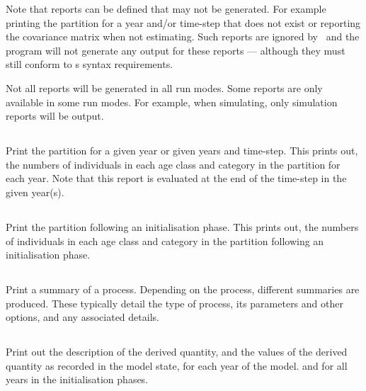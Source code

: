 Note that reports can be defined that may not be generated. For example printing the partition for a year and/or time-step that does not exist or reporting the covariance matrix when not estimating. Such reports are ignored by \CNAME\ and the program will not generate any output for these reports --- although they must still conform to \CNAME s syntax requirements.

Not all reports will be generated in all run modes. Some reports are only available in some run modes. For example, when simulating, only simulation reports will be output.

\subsection{}

Print the partition for a given year or given years and time-step. This prints out, the numbers of individuals in each age class and category in the partition for each year. Note that this report is evaluated at the end of the time-step in the given year(s).

\subsection{}

Print the partition following an initialisation phase. This prints out, the numbers of individuals in each age class and category in the partition following an initialisation phase.

\subsection{}
Print a summary of a process. Depending on the process, different summaries are produced. These typically detail the type of process, its parameters and other options, and any associated details.

\subsection{}

Print out the description of the derived quantity, and the values of the derived quantity as recorded in the model state, for each year of the model. and for all years in the  initialisation phases.

